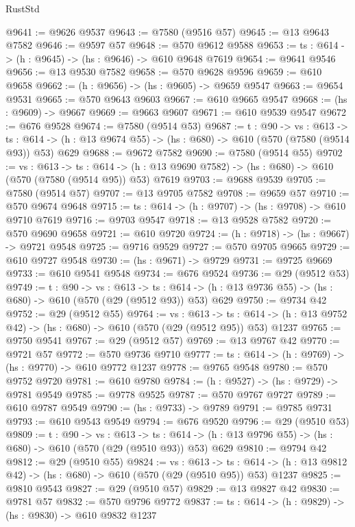 \begin{lexlean}{RustStd}
\begin{coremodule}
@9641 := @9626 @9537
@9643 := @7580 (@9516 @57)
@9645 := @13 @9643 @7582
@9646 := @9597 @57
@9648 := @570 @9612 @9588
@9653 := {ts : @614} -> (h : @9645) -> (hs : @9646) -> @610 @9648 @7619
@9654 := @9641 @9546
@9656 := @13 @9530 @7582
@9658 := @570 @9628 @9596
@9659 := @610 @9658
@9662 := (h : @9656) -> (hs : @9605) -> @9659 @9547
@9663 := @9654 @9531
@9665 := @570 @9643 @9603
@9667 := @610 @9665 @9547
@9668 := (hs : @9609) -> @9667
@9669 := @9663 @9607
@9671 := @610 @9539 @9547
@9672 := @676 @9528
@9674 := @7580 (@9514 @53)
@9687 := {t : @90} ->
  {vs : @613} ->
  {ts : @614} -> (h : @13 @9674 @55) -> (hs : @680) -> @610 (@570 (@7580 (@9514 @93)) @53) @629
@9688 := @9672 @7582
@9690 := @7580 (@9514 @55)
@9702 := {vs : @613} ->
  {ts : @614} -> (h : @13 @9690 @7582) -> (hs : @680) -> @610 (@570 (@7580 (@9514 @95)) @53) @7619
@9703 := @9688 @9539
@9705 := @7580 (@9514 @57)
@9707 := @13 @9705 @7582
@9708 := @9659 @57
@9710 := @570 @9674 @9648
@9715 := {ts : @614} -> (h : @9707) -> (hs : @9708) -> @610 @9710 @7619
@9716 := @9703 @9547
@9718 := @13 @9528 @7582
@9720 := @570 @9690 @9658
@9721 := @610 @9720
@9724 := (h : @9718) -> (hs : @9667) -> @9721 @9548
@9725 := @9716 @9529
@9727 := @570 @9705 @9665
@9729 := @610 @9727 @9548
@9730 := (hs : @9671) -> @9729
@9731 := @9725 @9669
@9733 := @610 @9541 @9548
@9734 := @676 @9524
@9736 := @29 (@9512 @53)
@9749 := {t : @90} ->
  {vs : @613} ->
  {ts : @614} -> (h : @13 @9736 @55) -> (hs : @680) -> @610 (@570 (@29 (@9512 @93)) @53) @629
@9750 := @9734 @42
@9752 := @29 (@9512 @55)
@9764 := {vs : @613} ->
  {ts : @614} -> (h : @13 @9752 @42) -> (hs : @680) -> @610 (@570 (@29 (@9512 @95)) @53) @1237
@9765 := @9750 @9541
@9767 := @29 (@9512 @57)
@9769 := @13 @9767 @42
@9770 := @9721 @57
@9772 := @570 @9736 @9710
@9777 := {ts : @614} -> (h : @9769) -> (hs : @9770) -> @610 @9772 @1237
@9778 := @9765 @9548
@9780 := @570 @9752 @9720
@9781 := @610 @9780
@9784 := (h : @9527) -> (hs : @9729) -> @9781 @9549
@9785 := @9778 @9525
@9787 := @570 @9767 @9727
@9789 := @610 @9787 @9549
@9790 := (hs : @9733) -> @9789
@9791 := @9785 @9731
@9793 := @610 @9543 @9549
@9794 := @676 @9520
@9796 := @29 (@9510 @53)
@9809 := {t : @90} ->
  {vs : @613} ->
  {ts : @614} -> (h : @13 @9796 @55) -> (hs : @680) -> @610 (@570 (@29 (@9510 @93)) @53) @629
@9810 := @9794 @42
@9812 := @29 (@9510 @55)
@9824 := {vs : @613} ->
  {ts : @614} -> (h : @13 @9812 @42) -> (hs : @680) -> @610 (@570 (@29 (@9510 @95)) @53) @1237
@9825 := @9810 @9543
@9827 := @29 (@9510 @57)
@9829 := @13 @9827 @42
@9830 := @9781 @57
@9832 := @570 @9796 @9772
@9837 := {ts : @614} -> (h : @9829) -> (hs : @9830) -> @610 @9832 @1237

\end{coremodule}
\end{lexlean}
